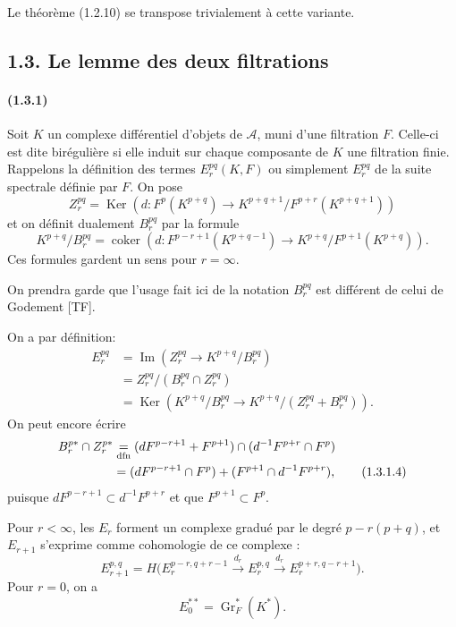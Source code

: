 \documentclass[10pt]{article}
\newcommand{\Gr}{\operatorname{Gr}}
\newcommand{\Ker}{\operatorname{Ker}}
\newcommand{\Imop}{\operatorname{Im}}
\newcommand{\coker}{\operatorname{coker}}
\newcommand{\calA}{\mathcal A}
\begin{document}
Le théorème (1.2.10) se transpose trivialement à cette variante.

\subsection*{1.3. Le lemme des deux filtrations}

\paragraph{(1.3.1)} Soit $K$ un complexe différentiel d'objets de $\calA$, muni d'une filtration $F$. Celle-ci est dite birégulière si elle induit sur chaque composante de $K$ une filtration finie. Rappelons la définition des termes $E_r^{pq}(K,F)$ ou simplement $E_r^{pq}$ de la suite spectrale définie par $F$. On pose
\[
Z_r^{pq}=\Ker\left(d:F^p(K^{p+q})\to K^{p+q+1}/F^{p+r}(K^{p+q+1})\right)
\]
et on définit dualement $B_r^{pq}$ par la formule
\[
K^{p+q}/B_r^{pq}=\coker\left(d:F^{p-r+1}(K^{p+q-1})\to K^{p+q}/F^{p+1}(K^{p+q})\right).
\]
Ces formules gardent un sens pour $r=\infty$.

On prendra garde que l'usage fait ici de la notation $B_r^{pq}$ est différent de celui de Godement [TF].

On a par définition:
\begin{align}
E_r^{pq}&=\Imop\left(Z_r^{pq}\to K^{p+q}/B_r^{pq}\right) \tag{1.3.1.1}\\
&=Z_r^{pq}/(B_r^{pq}\cap Z_r^{pq}) \tag{1.3.1.2}\\
&=\Ker\left(K^{p+q}/B_r^{pq}\to K^{p+q}/(Z_r^{pq}+B_r^{pq})\right). \tag{1.3.1.3}
\end{align}
On peut encore écrire
\begin{align}
B_r^{p*}\cap Z_r^{p*}
&\underset{\mathrm{dfn}}{=}(dF^{p-r+1}+F^{p+1})\cap(d^{-1}F^{p+r}\cap F^p) \notag\\
&=(dF^{p-r+1}\cap F^p)+(F^{p+1}\cap d^{-1}F^{p+r}), \tag{1.3.1.4}
\end{align}
puisque $dF^{p-r+1}\subset d^{-1}F^{p+r}$ et que $F^{p+1}\subset F^p$.


Pour $r<\infty$, les $E_r$ forment un complexe gradué par le degré $p-r(p+q)$, et $E_{r+1}$ s'exprime comme cohomologie de ce complexe :
\[
\tag{1.3.1.5}
E_{r+1}^{p,q}=H\bigl(E_r^{p-r,q+r-1}\xrightarrow{d_r}E_r^{p,q}\xrightarrow{d_r}E_r^{p+r,q-r+1}\bigr).
\]
Pour $r=0$, on a
\[
\tag{1.3.1.6}
E_0^{**}=\Gr_F^*(K^*).
\]
\end{document}
